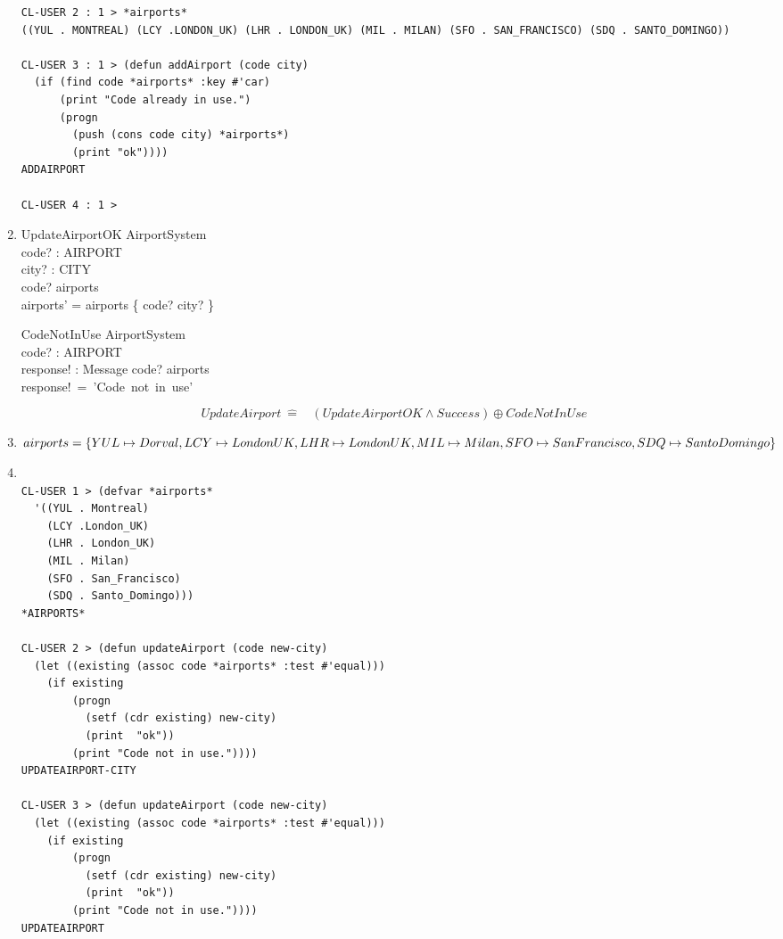 \documentclass[12pt]{article}
\begin{document}
\begin{enumerate}
\begin{verbatim}
CL-USER 2 : 1 > *airports*
((YUL . MONTREAL) (LCY .LONDON_UK) (LHR . LONDON_UK) (MIL . MILAN) (SFO . SAN_FRANCISCO) (SDQ . SANTO_DOMINGO))

CL-USER 3 : 1 > (defun addAirport (code city)
  (if (find code *airports* :key #'car)
      (print "Code already in use.")
      (progn
        (push (cons code city) *airports*)
        (print "ok"))))
ADDAIRPORT

CL-USER 4 : 1 > 
\end{verbatim}
\item
\begin{schema}{UpdateAirportOK}
\Delta AirportSystem\\
code? : AIRPORT\\
city? : CITY\\
\where
code? \in \dom airports\\
airports' = airports \oplus \{ code? \mapsto city? \}\\
\end{schema}
\begin{schema}{CodeNotInUse}
\Xi AirportSystem\\
code? : AIRPORT\\
response! : Message
\ST
code? \notin \dom airports\\
response!~=~'Code~not~in~use'
\end{schema}
\[ UpdateAirport~\hat{=}~~~~(UpdateAirportOK\wedge Success) \oplus CodeNotInUse\]
\item
$
airports =
\{
YUL \mapsto Dorval,\\
LCY  \mapsto London UK,\\
LHR \mapsto London UK,\\
MIL \mapsto Milan,\\
SFO \mapsto San Francisco,\\
SDQ \mapsto Santo Domingo\\
\}$
\item\begin{verbatim}

CL-USER 1 > (defvar *airports*
  '((YUL . Montreal)
    (LCY .London_UK)
    (LHR . London_UK)
    (MIL . Milan)
    (SFO . San_Francisco)
    (SDQ . Santo_Domingo)))
*AIRPORTS*

CL-USER 2 > (defun updateAirport (code new-city)
  (let ((existing (assoc code *airports* :test #'equal)))
    (if existing
        (progn
          (setf (cdr existing) new-city)
          (print  "ok"))
        (print "Code not in use."))))
UPDATEAIRPORT-CITY

CL-USER 3 > (defun updateAirport (code new-city)
  (let ((existing (assoc code *airports* :test #'equal)))
    (if existing
        (progn
          (setf (cdr existing) new-city)
          (print  "ok"))
        (print "Code not in use."))))
UPDATEAIRPORT


\end{verbatim}
\end{enumerate}
\end{document}
